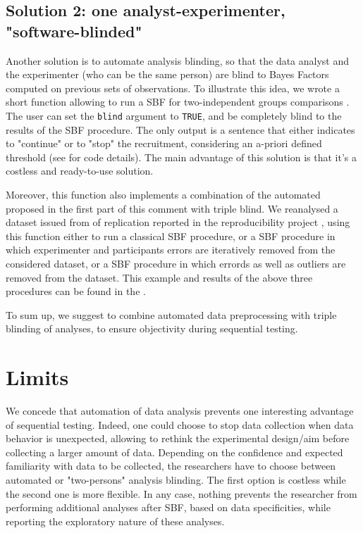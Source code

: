 \documentclass[a4paper,man,natbib,floatsintext,donotrepeattitle]{apa6}
\begin{document}
\subsection{Solution 2: one analyst-experimenter, "software-blinded"}

Another solution is to automate analysis blinding, so that the data analyst and the experimenter (who can be the same person) are blind to Bayes Factors computed on previous sets of observations. To illustrate this idea, we wrote a short function allowing to run a SBF for two-independent groups comparisons \citep[as in][]{schonbrodt_sequential_2017}. The user can set the \texttt{blind} argument to \texttt{TRUE}, and be completely blind to the results of the SBF procedure. The only output is a sentence that either indicates to "continue" or to "stop" the recruitment, considering an a-priori defined threshold (see  for code details). The main advantage of this solution is that it's a costless and ready-to-use solution.

Moreover, this function also implements a combination of the automated proposed in the first part of this comment with triple blind. We reanalysed a dataset issued from of replication reported in the reproducibility project \citep{open_science_collaboration_estimating_2015}, using this function either to run a classical SBF procedure, or a SBF procedure in which experimenter and participants errors are iteratively removed from the considered dataset, or a SBF procedure in which errords as well as outliers are removed from the dataset. This example and results of the above three procedures can be found in the . 

To sum up, we suggest to combine automated data preprocessing with triple blinding of analyses, to ensure objectivity during sequential testing.

\section{Limits}

We concede that automation of data analysis prevents one interesting advantage of sequential testing. Indeed, one could choose to stop data collection when data behavior is unexpected, allowing to rethink the experimental design/aim \citep{lakens_performing_2014} before collecting a larger amount of data. Depending on the confidence and expected familiarity with data to be collected, the researchers have to choose between automated or "two-persons" analysis blinding. The first option is costless while the second one is more flexible. In any case, nothing prevents the researcher from performing additional analyses after SBF, based on data specificities, while reporting the exploratory nature of these analyses.
\end{document}
